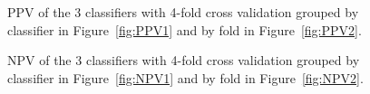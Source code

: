 \documentclass[a4paper,11pt]{article}
\begin{document}

\begin{figure}[!h]
	\centering
	\caption{PPV of the 3 classifiers with 4-fold cross validation grouped by classifier in Figure~\ref{fig:PPV1} and by fold in Figure~\ref{fig:PPV2}.}
	\label{fig:RealPPV}
\end{figure}

\begin{figure}[!h]
	\centering
	\caption{NPV of the 3 classifiers with 4-fold cross validation grouped by classifier in Figure~\ref{fig:NPV1} and by fold in Figure~\ref{fig:NPV2}.}
	\label{fig:RealNPV}
\end{figure}
\end{document}
